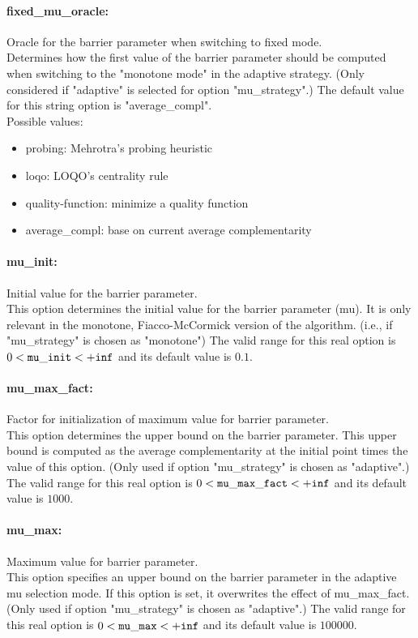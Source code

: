 \paragraph{fixed\_mu\_oracle:}\label{sec:fixed_mu_oracle} Oracle for the barrier parameter when switching to fixed mode. $\;$ \\
 Determines how the first value of the barrier
parameter should be computed when switching to
the "monotone mode" in the adaptive strategy.
(Only considered if "adaptive" is selected for
option "mu\_strategy".)
The default value for this string option is "average\_compl".
\\ 
Possible values:
\begin{itemize}
   \item probing: Mehrotra's probing heuristic
   \item loqo: LOQO's centrality rule
   \item quality-function: minimize a quality function
   \item average\_compl: base on current average complementarity
\end{itemize}

\paragraph{mu\_init:}\label{sec:mu_init} Initial value for the barrier parameter. $\;$ \\
 This option determines the initial value for the
barrier parameter (mu).  It is only relevant in
the monotone, Fiacco-McCormick version of the
algorithm. (i.e., if "mu\_strategy" is chosen as
"monotone") The valid range for this real option is 
$0 <  {\tt mu\_init } <  {\tt +inf}$
and its default value is $0.1$.


\paragraph{mu\_max\_fact:}\label{sec:mu_max_fact} Factor for initialization of maximum value for barrier parameter. $\;$ \\
 This option determines the upper bound on the
barrier parameter.  This upper bound is computed
as the average complementarity at the initial
point times the value of this option. (Only used
if option "mu\_strategy" is chosen as "adaptive".) The valid range for this real option is 
$0 <  {\tt mu\_max\_fact } <  {\tt +inf}$
and its default value is $1000$.


\paragraph{mu\_max:}\label{sec:mu_max} Maximum value for barrier parameter. $\;$ \\
 This option specifies an upper bound on the
barrier parameter in the adaptive mu selection
mode.  If this option is set, it overwrites the
effect of mu\_max\_fact. (Only used if option
"mu\_strategy" is chosen as "adaptive".) The valid range for this real option is 
$0 <  {\tt mu\_max } <  {\tt +inf}$
and its default value is $100000$.


